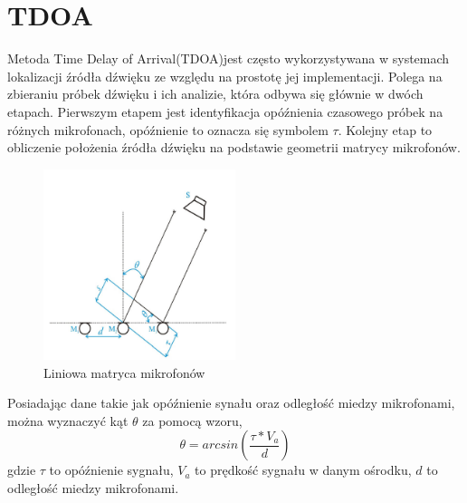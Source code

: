 \documentclass[eng,printmode]{mgr}
\begin{document}
\section{TDOA}
Metoda Time Delay of Arrival(TDOA)jest często wykorzystywana w systemach lokalizacji źródła dźwięku ze względu na prostotę jej implementacji. Polega na zbieraniu próbek dźwięku i ich analizie, która odbywa się głównie w dwóch etapach. Pierwszym etapem jest identyfikacja opóźnienia czasowego próbek na różnych mikrofonach, opóźnienie to oznacza się symbolem $\tau$. Kolejny etap to obliczenie położenia źródła dźwięku na podstawie geometrii matrycy mikrofonów.
\begin{figure}[ht]

    \centering

  \includegraphics[width=0.5\textwidth, angle=0]{matryca.png}

    \caption{Liniowa matryca mikrofonów}

    

\end{figure}
\newpage Posiadając dane takie jak  opóźnienie synału oraz odległość miedzy mikrofonami, można wyznaczyć kąt $\theta$ za pomocą wzoru,
\begin{equation}
\theta = arcsin(\frac{\tau*V_{a}}{d}) 
\end{equation}
gdzie $\tau$ to opóźnienie sygnału, $V_{a}$ to prędkość sygnału w danym ośrodku, $d$ to odległość miedzy mikrofonami.
\end{document}
